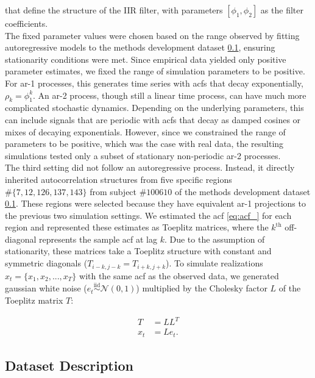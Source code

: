 \documentclass[main.tex]{subfiles}
\begin{document}
that define the structure of the IIR filter, with parameters $[\phi_1, \phi_2]$ as the filter coefficients. \\

The fixed parameter values were chosen based on the range observed by fitting autoregressive models to the methods development dataset \ref{subsec:dataset-description}, ensuring stationarity conditions were met. Since empirical data yielded only positive parameter estimates, we fixed the range of simulation parameters to be positive. For ar-1 processes, this generates time series with acfs that decay exponentially, $\rho_k = \phi_1^k$. An ar-2 process, though still a linear time process, can have much more complicated stochastic dynamics. Depending on the underlying parameters, this can include signals that are periodic with acfs that decay as damped cosines or mixes of decaying exponentials. However, since we constrained the range of parameters to be positive, which was the case with real data, the resulting simulations tested only a subset of stationary non-periodic ar-2 processes.\\

The third setting did not follow an autoregressive process. Instead, it directly inherited autocorrelation structures from five specific regions $\# \{7, 12, 126, 137, 143\}$ from subject $\#100610$ of the methods development dataset \ref{subsec:dataset-description}. These regions were selected because they have equivalent ar-1 projections to the previous two simulation settings. We estimated the acf \eqref{eq:acf_} for each region and represented these estimates as Toeplitz matrices, where the $k^{\text{th}}$ off-diagonal represents the sample acf at lag $k$. Due to the assumption of stationarity, these matrices take a Toeplitz structure with constant and symmetric diagonals ($T_{i-k, j-k} = T_{i+k, j+k}$). To simulate realizations $x_t = \{x_1, x_2, ..., x_T\}$ with the same acf as the observed data, we generated gaussian white noise ($e_t \overset{\text{iid}}{\sim} \mathcal{N}(0, 1)$) multiplied by the Cholesky factor $L$ of the Toeplitz matrix $T$:

\begin{align*}
    T &= LL^T\\
    x_t &= L e_t.
\end{align*}

\subsection{Dataset Description}\label{subsec:dataset-description}
\end{document}
